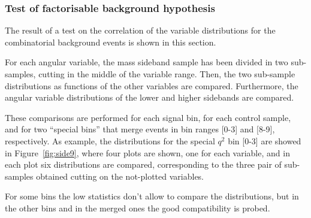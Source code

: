 \subsubsection{Test of factorisable background hypothesis}
\label{sec:fact}

The result of a test on the correlation of the variable distributions for the combinatorial background events is shown in this section.

For each angular variable, the mass sideband sample has been divided in two sub-samples, cutting in the middle of the variable range.
Then, the two sub-sample distributions as functions of the other variables are compared.
Furthermore, the angular variable distributions of the lower and higher sidebands are compared.

These comparisons are performed for each signal bin, for each control sample, and for two ``special bins'' that merge events in bin ranges [0-3] and [8-9], respectively.
As example, the distributions for the special $q^2$ bin [0-3] are showed in Figure~\ref{fig:side9}, where four plots are shown, one for each variable, and in each plot six distributions are compared, corresponding to the three pair of sub-samples obtained cutting on the not-plotted variables.

For some bins the low statistics don't allow to compare the distributions, but in the other bins and in the merged ones the good compatibility is probed.


